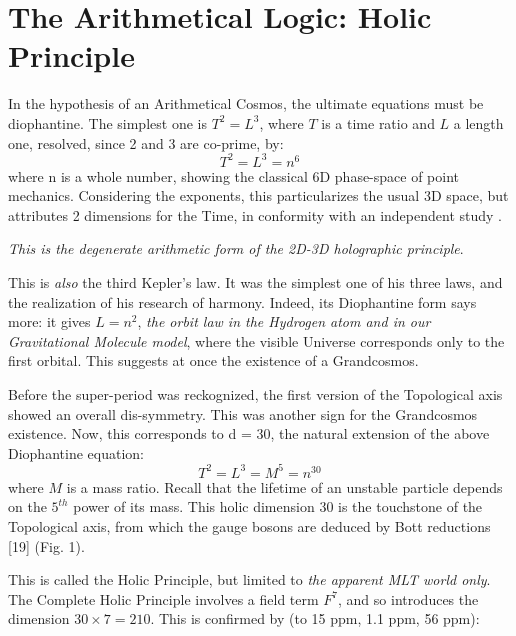 \documentclass[twoside,draft]{article}
\begin{document}
\begin{sloppypar}
\section{The Arithmetical Logic: Holic Principle}

In the hypothesis of an Arithmetical Cosmos, the ultimate equations must be diophantine. The
simplest one is $T^{2} = L^{3}$, where $T$ is a time ratio and $L$ a length one, resolved, since 2 and 3 are 
co-prime, by:
\begin{equation}
T^{2} = L^{3} = n^{6}
\end{equation}
where n is a whole number, showing the classical 6D phase-space of point mechanics. Considering the exponents, this particularizes the usual 3D space, but attributes 2 dimensions for the Time, in conformity with an independent study \cite{Bars}.

\textit{This is the degenerate arithmetic form of the 2D-3D holographic principle}.

This is \textit{also} the third Kepler's law. It was the simplest one of his three laws, and the realization of his research of harmony. Indeed, its Diophantine form says more: it gives $L = n^{2}$, \textit{the orbit law in the Hydrogen atom and in our Gravitational Molecule model}, where the visible Universe corresponds only to the first orbital. This suggests at once the existence of a Grandcosmos. 

Before the super-period was reckognized, the first version of the Topological axis \cite{Sanchez1} showed an overall dis-symmetry. This was another sign for the Grandcosmos existence.   Now, this corresponds to d = 30, the natural extension of the above Diophantine equation:
\begin{equation}
T^{2} = L^{3} = M^{5} = n^{30}
\end{equation}
where $M$ is a mass ratio. Recall that the lifetime of an unstable particle depends on the $5^{th}$ power of its mass. This holic dimension 30 is the touchstone of the Topological axis, from which the gauge bosons are deduced by Bott reductions [19] (Fig. 1).

This is called the Holic Principle, but limited to \textit{the apparent MLT world only}. The Complete Holic
Principle \cite{Sanchez4} involves a field term $F^{7}$, and so introduces the dimension $30 \times 7 = 210$. This is confirmed by (to 15 ppm, 1.1 ppm, 56 ppm):


\end{sloppypar}
\end{document}
